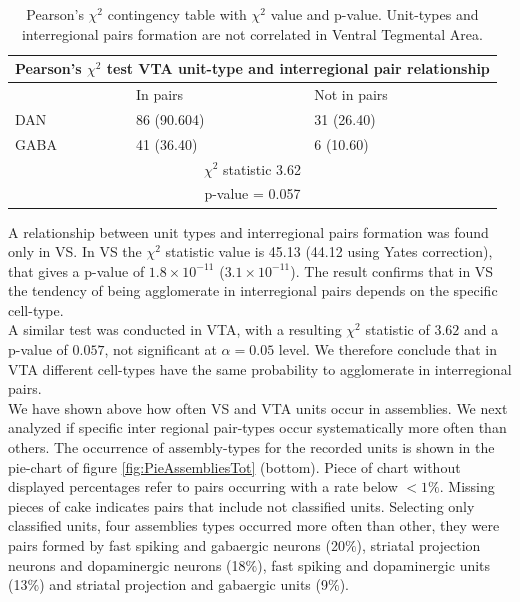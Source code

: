 \begin{table}[H]
\begin{tabular}{ |p{3cm}|p{3cm}|p{3cm}| }
 \hline
 \multicolumn{3}{|c|}{Pearson's $\chi^2$ test VTA unit-type and interregional pair relationship} \\
 \hline
 & In pairs & Not in pairs\\
 \hline
 DAN & 86 (90.604) & 31 (26.40) \\
 \hline
 GABA & 41 (36.40) & 6 (10.60)\\
 \hline
 \multicolumn{3}{|c|}{$\chi^2$ statistic  3.62}\\
 \multicolumn{3}{|c|}{p-value = 0.057}\\
 \hline
\end{tabular}
\caption{Pearson's $\chi^2$ contingency table with $\chi^2$ value and p-value. Unit-types and interregional pairs formation are not correlated in Ventral Tegmental Area.}
\label{tab:chi2_asnotasVTA}
\end{table}
A relationship between unit types and interregional pairs formation was found only in VS. In VS the $\chi^2$ statistic value is 45.13 (44.12 using Yates correction), that gives a p-value of $1.8\times10^{-11}$ ($3.1\times10^{-11}$). The result confirms that in VS the tendency of being agglomerate in interregional pairs depends on the specific cell-type.\\A similar test was conducted in VTA, with a resulting $\chi^2$ statistic of $3.62$ and a p-value of $0.057$, not significant at $\alpha = 0.05$ level. We therefore conclude that in VTA different cell-types have the same probability to agglomerate in interregional pairs.\\
 We have shown above how often VS and VTA units occur in assemblies. We next analyzed if specific inter regional pair-types occur systematically more often than others. The occurrence of assembly-types for the recorded units is shown in the pie-chart of figure  \ref{fig:PieAssembliesTot} (bottom). Piece of chart without displayed percentages refer to pairs occurring with a rate below $< 1\%$.  Missing pieces of cake indicates pairs that include not classified units. Selecting only classified units, four assemblies types occurred more often than other, they were pairs formed by fast spiking and gabaergic neurons (20$\%$), striatal projection neurons and dopaminergic neurons (18$\%$), fast spiking and dopaminergic units (13$\%$) and striatal projection and gabaergic units (9$\%$).\\
